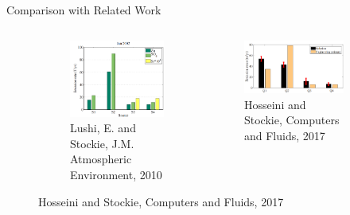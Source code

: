 \documentclass[11pt]{beamer}
\theoremstyle{plain}
\theoremstyle{definition}
\begin{document}
\begin{frame}{Comparison with Related Work}
\begin{figure}
\begin{columns}[c]
\begin{figure}
\includegraphics[scale=0.25]{Stockie_Lushi}
\caption{Lushi, E. and Stockie, J.M. Atmospheric Environment, 2010}
\end{figure}
\begin{figure}
\includegraphics[scale=0.28]{Hosseini}
\caption{Hosseini and Stockie, Computers and Fluids, 2017}
\end{figure}
\end{columns}
\end{figure}
\end{frame}
\end{document}
